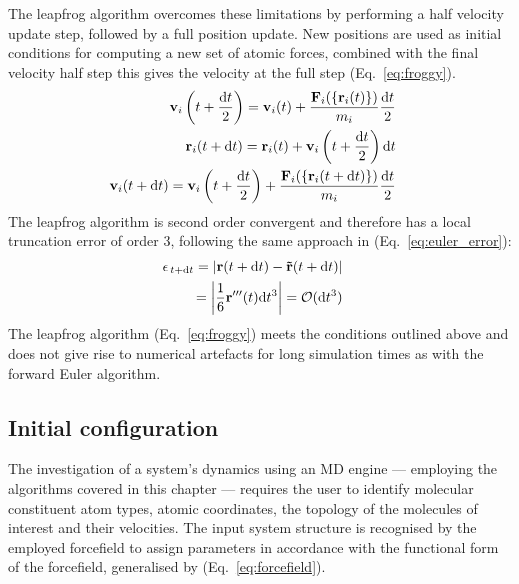 The leapfrog algorithm overcomes these limitations by performing a half velocity update step, followed by a full position update. New positions are used as initial conditions for computing a new set of atomic forces, combined with the final velocity half step this gives the velocity at the full step (Eq.~\ref{eq:froggy}).  
\begin{subequations} \label{eq:froggy}
\begin{align}
\begin{split}
\mathbf{v}_{i} \left(t + \frac{\mathrm{d}t}{2}\right) &= \textbf{v}_{i} (t) + \frac{\mathbf{F}_i(\{\mathbf{r}_i(t)\})}{m_i}\frac{\mathrm{d}t}{2} 
\end{split}\\
\begin{split}
\mathbf{r}_{i} (t + \mathrm{d}t) &= \mathbf{r}_{i} (t) + \mathbf{v}_{i} \left(t + \frac{\mathrm{d}t}{2}\right)\mathrm{d}t
\end{split}\\
\begin{split}
\mathbf{v}_{i} (t + \mathrm{d}t) &= \textbf{v}_{i} \left(t + \frac{\mathrm{d}t}{2}\right) + \frac{\mathbf{F}_i(\{\mathbf{r}_i(t+\mathrm{d}t)\})}{m_i}\frac{\mathrm{d}t}{2}
\end{split}
\end{align}
\end{subequations}
The leapfrog algorithm is second order convergent and therefore has a local truncation error of order 3, following the same approach in (Eq.~\ref{eq:euler_error}):
\begin{subequations} \label{eq:froggy_error}
\begin{align}
\begin{split}
    \epsilon_{\,t+\mathrm{d}t} &= \left|\mathbf{r}(t+\mathrm{d}t) - \mathbf{\tilde{r}}(t+\mathrm{d}t)\right|
\end{split}\\
\begin{split}
    &= \left| \frac{1}{6} \mathbf{r'''}(t)\mathrm{d}t^3 \right| = \mathcal{O}(\mathrm{d}t^3)
\end{split}
\end{align}
\end{subequations}
The leapfrog algorithm (Eq.~\ref{eq:froggy}) meets the conditions outlined above and does not give rise to numerical artefacts for long simulation times as with the forward Euler algorithm. 

\subsection{Initial configuration} 
%
The investigation of a system's dynamics using an MD engine --- employing the algorithms covered in this chapter --- requires the user to identify molecular constituent atom types, atomic coordinates, the topology of the molecules of interest and their velocities. The input system structure is recognised by the employed forcefield to assign parameters in accordance with the functional form of the forcefield, generalised by (Eq.~\ref{eq:forcefield}). 

